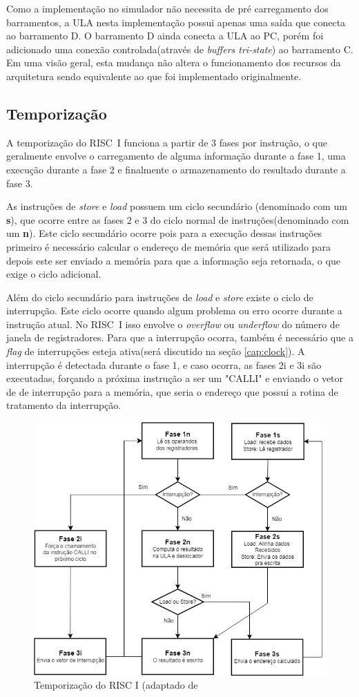 \documentclass[
	article,			%
	11pt,				%
	oneside,			%
	a4paper,			%
	english,			%
	brazil,				%
	sumario=tradicional
	]{abntex2}
\begin{document}
Como a implementação no simulador não necessita de pré carregamento dos barramentos, a ULA nesta implementação possui apenas uma saída que conecta ao barramento D. O barramento D ainda conecta a ULA ao PC, porém foi adicionado uma conexão controlada(através de \textit{buffers tri-state}) ao barramento C. Em uma visão geral, esta mudança não altera o funcionamento dos recursos da arquitetura sendo equivalente ao que foi implementado originalmente.

\subsection{Temporização}\label{cap:timing}
A temporização do RISC~I funciona a partir de 3 fases por instrução, o que geralmente envolve o carregamento de alguma informação durante a fase 1, uma execução durante a fase 2 e finalmente o armazenamento do resultado durante a fase 3. 

As instruções de \textit{store} e \textit{load} possuem um ciclo secundário (denominado com um \textbf{s}), que ocorre entre as fases 2 e 3 do ciclo normal de instruções(denominado com um \textbf{n}). Este ciclo secundário ocorre pois para a execução dessas instruções primeiro é necessário calcular o endereço de memória que será utilizado para depois este ser enviado a memória para que a informação seja retornada, o que exige o ciclo adicional. 

Além do ciclo secundário para instruções de \textit{load} e \textit{store} existe o ciclo de interrupção. Este ciclo ocorre quando algum problema ou erro ocorre durante a instrução atual. No RISC~I isso envolve o \textit{overflow} ou \textit{underflow} do número de janela de registradores. Para que a interrupção ocorra, também é necessário que a \textit{flag} de interrupções esteja ativa(será discutido na seção \ref{cap:clock}). A interrupção é detectada durante o fase 1, e caso ocorra, as fases 2i e 3i são executadas, forçando a próxima instrução a ser um "CALLI" e enviando o vetor de de interrupção para a memória, que seria o endereço que possui a rotina de tratamento da interrupção.
\begin{figure}
    \centering
    \includegraphics[width=0.75\linewidth]{Logisim/temporizaçãorisc.png}
    \caption{Temporização do RISC I (adaptado de }
    \label{fig:temporizationDiagram}
\end{figure}
\end{document}
